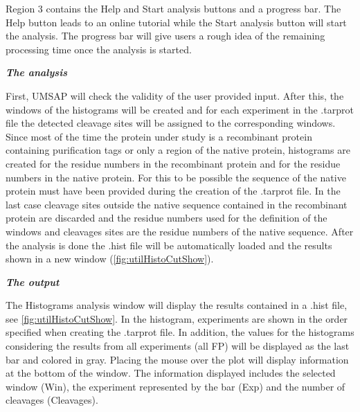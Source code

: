 Region \num{3} contains the Help and Start analysis buttons and a progress bar. The Help button leads to an online tutorial while the Start analysis button will start the analysis. The progress bar will give users a rough idea of the remaining processing time once the analysis is started.

\textit{\textbf{The analysis}}

First, UMSAP will check the validity of the user provided input. After this, the windows of the histograms will be created and for each experiment in the .tarprot file the detected cleavage sites will be assigned to the corresponding windows. Since most of the time the protein under study is a recombinant protein containing purification tags or only a region of the native protein, histograms are created for the residue numbers in the recombinant protein and for the residue numbers in the native protein. For this to be possible the sequence of the native protein must have been provided during the creation of the .tarprot file. In the last case cleavage sites outside the native sequence contained in the recombinant protein are discarded and the residue numbers used for the definition of the windows and cleavages sites are the residue numbers of the native sequence. After the analysis is done the .hist file will be automatically loaded and the results shown in a new window (\autoref{fig:utilHistoCutShow}).

\textit{\textbf{The output}}

The Histograms analysis window will display the results contained in a .hist file, see \autoref{fig:utilHistoCutShow}. In the histogram, experiments are shown in the order specified when creating the .tarprot file. In addition, the values for the histograms considering the results from all experiments (all FP) will be displayed as the last bar and colored in gray. Placing the mouse over the plot will display information at the bottom of the window. The information displayed includes the selected window (Win), the experiment represented by the bar (Exp) and the number of cleavages (Cleavages).

